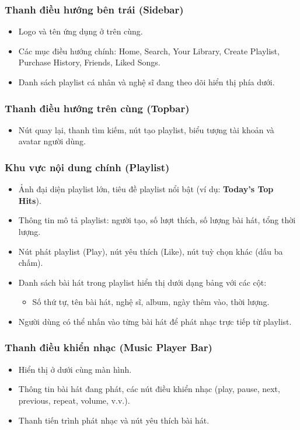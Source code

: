 \documentclass{book}
\begin{document}
\subsubsection{Thanh điều hướng bên trái (Sidebar)}
\begin{itemize}
    \item Logo và tên ứng dụng ở trên cùng.
    \item Các mục điều hướng chính: Home, Search, Your Library, Create Playlist, Purchase History, Friends, Liked Songs.
    \item Danh sách playlist cá nhân và nghệ sĩ đang theo dõi hiển thị phía dưới.
\end{itemize}

\subsubsection{Thanh điều hướng trên cùng (Topbar)}
\begin{itemize}
    \item Nút quay lại, thanh tìm kiếm, nút tạo playlist, biểu tượng tài khoản và avatar người dùng.
\end{itemize}

\subsubsection{Khu vực nội dung chính (Playlist)}
\begin{itemize}
    \item Ảnh đại diện playlist lớn, tiêu đề playlist nổi bật (ví dụ: \textbf{Today's Top Hits}).
    \item Thông tin mô tả playlist: người tạo, số lượt thích, số lượng bài hát, tổng thời lượng.
    \item Nút phát playlist (Play), nút yêu thích (Like), nút tuỳ chọn khác (dấu ba chấm).
    \item Danh sách bài hát trong playlist hiển thị dưới dạng bảng với các cột:
    \begin{itemize}
        \item Số thứ tự, tên bài hát, nghệ sĩ, album, ngày thêm vào, thời lượng.
    \end{itemize}
    \item Người dùng có thể nhấn vào từng bài hát để phát nhạc trực tiếp từ playlist.
\end{itemize}

\subsubsection{Thanh điều khiển nhạc (Music Player Bar)}
\begin{itemize}
    \item Hiển thị ở dưới cùng màn hình.
    \item Thông tin bài hát đang phát, các nút điều khiển nhạc (play, pause, next, previous, repeat, volume, v.v.).
    \item Thanh tiến trình phát nhạc và nút yêu thích bài hát.
\end{itemize}
\end{document}
